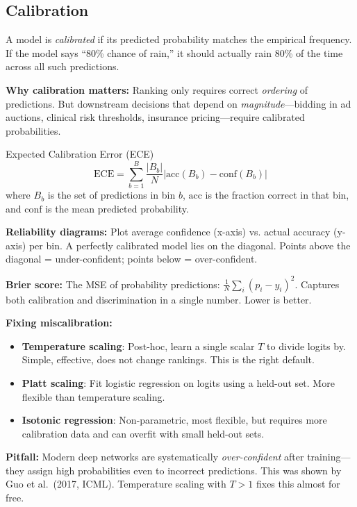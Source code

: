\subsection{Calibration}

A model is \textit{calibrated} if its predicted probability matches the empirical frequency. If the model says ``80\% chance of rain,'' it should actually rain 80\% of the time across all such predictions.

\textbf{Why calibration matters:} Ranking only requires correct \textit{ordering} of predictions. But downstream decisions that depend on \textit{magnitude}---bidding in ad auctions, clinical risk thresholds, insurance pricing---require calibrated probabilities.

\begin{mathresult}{Expected Calibration Error (ECE)}
\[
\text{ECE} = \sum_{b=1}^{B} \frac{|B_b|}{N} \left| \text{acc}(B_b) - \text{conf}(B_b) \right|
\]
where $B_b$ is the set of predictions in bin $b$, $\text{acc}$ is the fraction correct in that bin, and $\text{conf}$ is the mean predicted probability.
\end{mathresult}

\textbf{Reliability diagrams:} Plot average confidence (x-axis) vs. actual accuracy (y-axis) per bin. A perfectly calibrated model lies on the diagonal. Points above the diagonal = under-confident; points below = over-confident.

\textbf{Brier score:} The MSE of probability predictions: $\frac{1}{N}\sum_i (p_i - y_i)^2$. Captures both calibration and discrimination in a single number. Lower is better.

\textbf{Fixing miscalibration:}
\begin{itemize}
    \item \textbf{Temperature scaling}: Post-hoc, learn a single scalar $T$ to divide logits by. Simple, effective, does not change rankings. This is the right default.
    \item \textbf{Platt scaling}: Fit logistic regression on logits using a held-out set. More flexible than temperature scaling.
    \item \textbf{Isotonic regression}: Non-parametric, most flexible, but requires more calibration data and can overfit with small held-out sets.
\end{itemize}

\textbf{Pitfall:} Modern deep networks are systematically \textit{over-confident} after training---they assign high probabilities even to incorrect predictions. This was shown by Guo et al.\ (2017, ICML). Temperature scaling with $T > 1$ fixes this almost for free.

